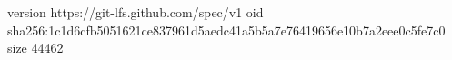 version https://git-lfs.github.com/spec/v1
oid sha256:1c1d6cfb5051621ce837961d5aedc41a5b5a7e76419656e10b7a2eee0c5fe7c0
size 44462

